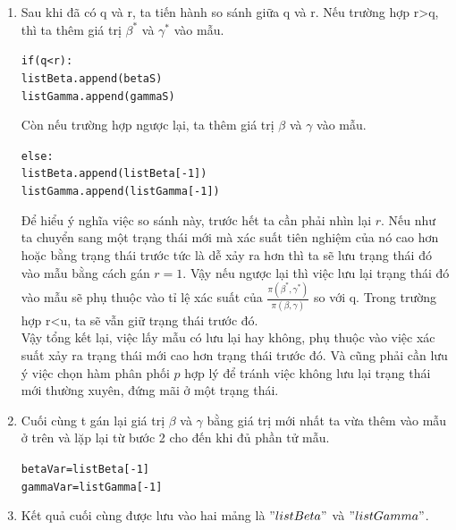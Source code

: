 \documentclass[a4paper]{article}
\begin{document}
\begin{enumerate}
    \item Sau khi đã có q và r, ta tiến hành so sánh giữa q và r.
    Nếu trường hợp r>q, thì ta thêm giá trị $\beta^{*}$ và $\gamma^{*}$ vào mẫu. 
          \begin{mdframed}[hidealllines=true,backgroundcolor=magenta!10]
            \begin{alltt}
if (q < r):
    listBeta.append(betaS)
    listGamma.append(gammaS)
            \end{alltt}
    \end{mdframed}
    Còn nếu trường hợp ngược lại, ta thêm giá trị $\beta$ và $\gamma$ vào mẫu.
              \begin{mdframed}[hidealllines=true,backgroundcolor=magenta!10]
            \begin{alltt}
else:
    listBeta.append(listBeta[-1])
    listGamma.append(listGamma[-1])
            \end{alltt}
    \end{mdframed}
    Để hiểu ý nghĩa việc so sánh này, trước hết ta cần phải nhìn lại $r$. Nếu như ta chuyển sang một trạng thái mới mà xác suất tiên nghiệm của nó cao hơn hoặc bằng trạng thái trước tức là dễ xảy ra hơn thì ta sẽ lưu trạng thái đó vào mẫu bằng cách gán $r=1$. Vậy nếu ngược lại thì việc lưu lại trạng thái đó vào mẫu sẽ phụ thuộc vào tỉ lệ xác suất của $\frac{\pi(\beta^{*},\gamma^{*})}{\pi(\beta,\gamma)}$ so với q. Trong trường hợp r<u, ta sẽ vẫn giữ trạng thái trước đó.\\
    Vậy tổng kết lại, việc lấy mẫu có lưu lại hay không, phụ thuộc vào việc xác suất xảy ra trạng thái mới cao hơn trạng thái trước đó. Và cũng phải cần lưu ý việc chọn hàm phân phối $p$ hợp lý để tránh việc không lưu lại trạng thái mới thường xuyên, đứng mãi ở một trạng thái.
    \item Cuối cùng t gán lại giá trị $\beta$ và $\gamma$ bằng giá trị mới nhất ta vừa thêm vào mẫu ở trên và lặp lại từ bước 2 cho đến khi đủ phần tử mẫu.
                  \begin{mdframed}[hidealllines=true,backgroundcolor=magenta!10]
            \begin{alltt}
betaVar = listBeta[-1]
gammaVar = listGamma[-1]
            \end{alltt}
    \end{mdframed}
    \item Kết quả cuối cùng được lưu vào hai mảng là $"listBeta"$ và $"listGamma"$.\\

\end{enumerate}
\end{document}

